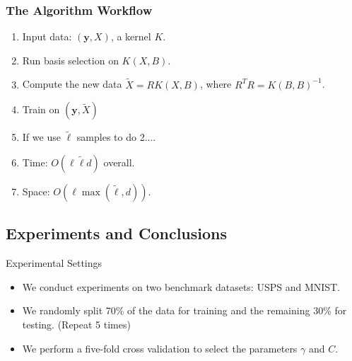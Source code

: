 \documentclass{beamer}
\def\by{{\boldsymbol y}}
\begin{document}
\begin{frame}
  \frametitle{The Algorithm Workflow}
  \begin{enumerate}
    \item Input data: $(\by, X)$, a kernel $K$.
    \item Run basis selection on $K(X, B)$.
    \item Compute the new data $\tilde{X} = RK(X, B)$, where $ R^TR =  K(B, B)^{-1}$.
    \item Train on $(\by, \tilde{X})$
    \pause
    \item [] If we use $\tilde{\ell}$ samples to do 2....
    \pause
    \item [] Time: $O(\ell \tilde{\ell} d)$ overall.
    \item [] Space: $O(\ell \max(\tilde{\ell}, d))$.
  \end{enumerate}
\end{frame}

\subsection{Experiments and Conclusions}
\begin{frame}{Experimental Settings}
\begin{itemize}
  \item We conduct experiments on two benchmark datasets: USPS and MNIST.
  \item We randomly split 70\% of the data for training and the remaining 30\% for testing. (Repeat 5 times)
  \item We perform a five-fold cross validation to select the parameters $\gamma$ and $C$.
\end{itemize}
\begin{table}
\caption{Dataset descriptions (with the number $\ell$ of instances and the dimension $d$ of the data). The sizes for storing the data $\ell d$ and the associated kernel matrices $\ell^2$ are also listed.}
\label{tab:datasets}
\end{table}
\end{frame}
\end{document}

